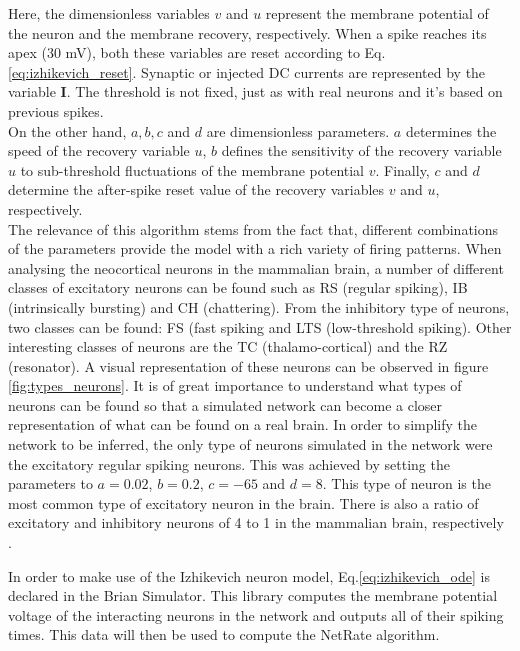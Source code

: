 \documentclass[11pt]{article}
\begin{document}
Here, the dimensionless variables $v$ and $u$ represent the membrane potential of the neuron and the membrane recovery, respectively. When a spike reaches its apex (30 mV), both these variables are reset according to Eq. \ref{eq:izhikevich_reset}. Synaptic or injected DC currents are represented by the variable \textbf{I}. The threshold is not fixed, just as with real neurons and it's based on previous spikes. 
\\
On the other hand, $a, b, c$ and $d$ are dimensionless parameters. $a$ determines the speed of the recovery variable $u$, $b$ defines the sensitivity of the recovery variable $u$ to sub-threshold fluctuations of the membrane potential $v$. Finally, $c$ and $d$ determine the after-spike reset value of the recovery variables $v$ and $u$, respectively. 
\\
The relevance of this algorithm stems from the fact that, different combinations of the parameters provide the model with a rich variety of firing patterns. When analysing the neocortical neurons in the mammalian brain, a number of different classes of excitatory neurons can be found \cite{connors1990intrinsic, gray1996chattering} such as RS (regular spiking), IB (intrinsically bursting) and CH (chattering). From the inhibitory type of neurons, two classes can be found: FS (fast spiking and LTS (low-threshold spiking). Other interesting classes of neurons are the TC (thalamo-cortical) and the RZ (resonator). A visual representation of these neurons can be observed in figure \ref{fig:types_neurons}. It is of great importance to understand what types of neurons can be found so that a simulated network can become a closer representation of what can be found on a real brain. In order to simplify the network to be inferred, the only type of neurons simulated in the network were the excitatory regular spiking neurons. This was achieved by setting the parameters to $a=0.02$, $b=0.2$, $c=-65$ and $d=8$. This type of neuron is the most common type of excitatory neuron in the brain. There is also a ratio of excitatory and inhibitory neurons of 4 to 1 in the mammalian brain, respectively \cite{izhikevich2003simple}.

In order to make use of the Izhikevich neuron model, Eq.\ref{eq:izhikevich_ode} is declared in the Brian Simulator. This library computes the membrane potential voltage of the interacting neurons in the network and outputs all of their spiking times. This data will then be used to compute the NetRate algorithm.
\end{document}
